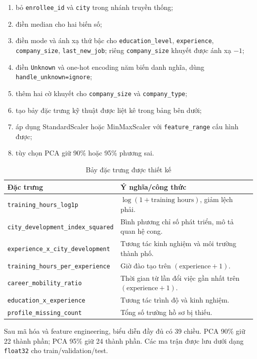 \documentclass[12pt,a4paper,oneside]{report}
\newcommand{\code}[1]{\texttt{#1}}
\begin{document}
\begin{enumerate}
  \item bỏ \code{enrollee\_id} và \code{city} trong nhánh truyền thống;
  \item điền median cho hai biến số;
  \item điền mode và ánh xạ thứ bậc cho \code{education\_level}, \code{experience}, \code{company\_size}, \code{last\_new\_job}; riêng \code{company\_size} khuyết được ánh xạ $-1$;
  \item điền \code{Unknown} và one-hot encoding năm biến danh nghĩa, dùng \code{handle\_unknown=ignore};
  \item thêm hai cờ khuyết cho \code{company\_size} và \code{company\_type};
  \item tạo bảy đặc trưng kỹ thuật được liệt kê trong bảng bên dưới;
  \item áp dụng StandardScaler hoặc MinMaxScaler với \code{feature\_range} cấu hình được;
  \item tùy chọn PCA giữ 90\% hoặc 95\% phương sai.
\end{enumerate}

\begin{table}[H]
\centering
\caption{Bảy đặc trưng được thiết kế}\label{tab:engineered-features}
\begin{tabularx}{\textwidth}{l X}
\toprule
\textbf{Đặc trưng} & \textbf{Ý nghĩa/công thức} \\
\midrule
\code{training\_hours\_log1p} & $\log(1+\text{training hours})$, giảm lệch phải. \\
\code{city\_development\_index\_squared} & Bình phương chỉ số phát triển, mô tả quan hệ cong. \\
\code{experience\_x\_city\_development} & Tương tác kinh nghiệm và môi trường thành phố. \\
\code{training\_hours\_per\_experience} & Giờ đào tạo trên $(\text{experience}+1)$. \\
\code{career\_mobility\_ratio} & Thời gian từ lần đổi việc gần nhất trên $(\text{experience}+1)$. \\
\code{education\_x\_experience} & Tương tác trình độ và kinh nghiệm. \\
\code{profile\_missing\_count} & Tổng số trường hồ sơ bị thiếu. \\
\bottomrule
\end{tabularx}
\end{table}

Sau mã hóa và feature engineering, biểu diễn đầy đủ có 39 chiều. PCA 90\% giữ 22 thành phần; PCA 95\% giữ 24 thành phần. Các ma trận được lưu dưới dạng \code{float32} cho train/validation/test.
\end{document}
